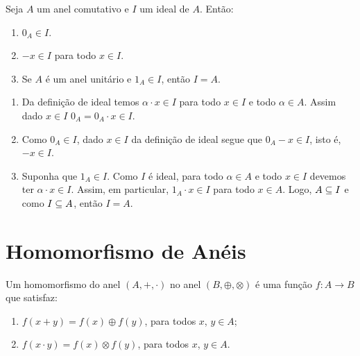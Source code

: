 \begin{proposicao}
    Seja $A$ um anel comutativo e $I$ um ideal de $A$. Então:
    \begin{enumerate}[label={\roman*})]
         \item $0_{A}\in I$.
         \item $-x \in I$ para todo $x \in I$.
         \item Se $A$ é um anel unitário e $1_A \in I$, então $I = A$.
    \end{enumerate}
\end{proposicao}
\begin{prova}
    \begin{enumerate}[label={\roman*})]
        \item Da definição de ideal temos $\alpha \cdot x \in I$ para todo $x \in I$ e todo $\alpha \in A$.
        Assim dado $x \in I$ $0_A = 0_A \cdot x \in I$.

        \item Como $0_A \in I$, dado $x \in I$ da definição de ideal segue que $0_A - x \in I$, isto é, $-x \in I$.

        \item Suponha que $1_A \in I$. Como $I$ é ideal, para todo $\alpha \in A$ e todo $x \in I$ devemos ter $\alpha\cdot x \in I$. Assim, em particular, $1_A \cdot x \in
            I$ para todo $x \in A$. Logo, $A\subseteq I$ e como $I\subseteq A$, então $I = A$.
    \end{enumerate}
\end{prova}

\section{Homomorfismo de Anéis} %
\label{sec:homomorfismo_de_aneis}

\begin{definicao}
    Um homomorfismo do anel $(A, +, \cdot)$ no anel $(B, \oplus, \otimes)$ é uma função $f : A \to B$ que satisfaz:
    \begin{enumerate}[label={\roman*})]
        \item $f(x + y) = f(x) \oplus f(y)$, para todos $x$, $y \in A$;
        \item $f(x \cdot y) = f(x)\otimes f(y)$, para todos $x$, $y \in A$.
    \end{enumerate}
\end{definicao}

